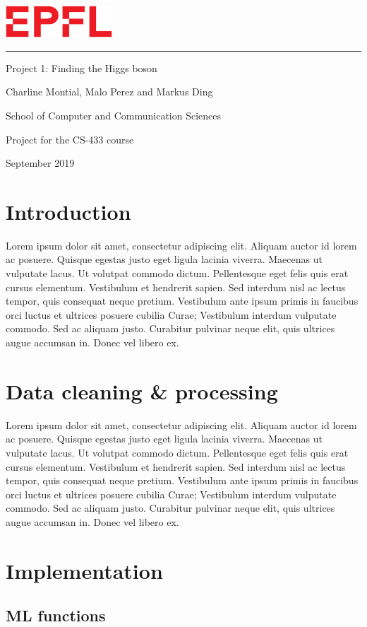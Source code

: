 \documentclass[11pt,a4paper]{article}
\newcommand{\logoepfl}[0]{
  \begin{center}
    \includegraphics[width=4cm]{logo_epfl.eps}
  \end{center}
  \vspace{0.3cm}
  \hrule
}
\newcommand{\project}[1]{
  \begin{center}
    \large{#1}
  \end{center}
  \vspace{1cm}
}
\newcommand{\department}[1]{
  \begin{center}
    \large{#1}
  \end{center}
}
\renewcommand{\author}[1]{
  \begin{center}
    \Large{#1}
  \end{center}
  \vspace{0.5cm}
}
\renewcommand{\title}[1]{
  \vspace{3cm}
  \begin{center}
    \huge{#1}
  \end{center}
  \vspace{1.7cm}
}
\renewcommand{\date}[2]{
  \begin{center}
    \normalsize{#1 #2}
  \end{center}
  \vspace{0.5cm}
}
\begin{document}
\thispagestyle{empty}

\logoepfl
  
  \title{Project 1: Finding the Higgs boson}
  
  \author{Charline Montial, Malo Perez and Markus Ding}
  \department{School of Computer and Communication Sciences}
  \project{Project for the CS-433 course}
  
  \date{September}{2019}

\newpage

\tableofcontents

\newpage

\section{Introduction}
Lorem ipsum dolor sit amet, consectetur adipiscing elit. Aliquam auctor id lorem ac posuere. Quisque egestas justo eget ligula lacinia viverra. Maecenas ut vulputate lacus. Ut volutpat commodo dictum. Pellentesque eget felis quis erat cursus elementum. Vestibulum et hendrerit sapien. Sed interdum nisl ac lectus tempor, quis consequat neque pretium. Vestibulum ante ipsum primis in faucibus orci luctus et ultrices posuere cubilia Curae; Vestibulum interdum vulputate commodo. Sed ac aliquam justo. Curabitur pulvinar neque elit, quis ultrices augue accumsan in. Donec vel libero ex. 

\section{Data cleaning \& processing}
Lorem ipsum dolor sit amet, consectetur adipiscing elit. Aliquam auctor id lorem ac posuere. Quisque egestas justo eget ligula lacinia viverra. Maecenas ut vulputate lacus. Ut volutpat commodo dictum. Pellentesque eget felis quis erat cursus elementum. Vestibulum et hendrerit sapien. Sed interdum nisl ac lectus tempor, quis consequat neque pretium. Vestibulum ante ipsum primis in faucibus orci luctus et ultrices posuere cubilia Curae; Vestibulum interdum vulputate commodo. Sed ac aliquam justo. Curabitur pulvinar neque elit, quis ultrices augue accumsan in. Donec vel libero ex.

\section{Implementation}

\subsection{ML functions}
\end{document}
